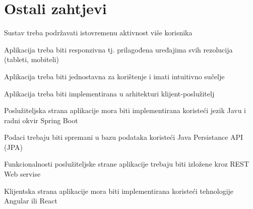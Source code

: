 		\section{Ostali zahtjevi}
			\begin{packed_item}
				\item Sustav treba podržavati istovremenu aktivnost više korisnika
				\item Aplikacija treba biti responzivna tj. prilagođena uređajima svih rezolucija (tableti, mobiteli) 
				\item Aplikacija treba biti jednostavna za korištenje i imati intuitivno sučelje
				\item Aplikacija treba biti implementirana u arhitekturi klijent-poslužitelj
				\item Poslužiteljska strana aplikacije mora biti implementirana koristeći jezik Javu i radni okvir Spring Boot
				\item Podaci trebaju biti spremani u bazu podataka koristeći Java Persistance API (JPA)
				\item Funkcionalnosti poslužiteljske strane aplikacije trebaju biti izložene kroz REST Web servise
				\item Klijentska strana aplikacije mora biti implementirana koristeći tehnologije Angular ili React
			\end{packed_item}
		 